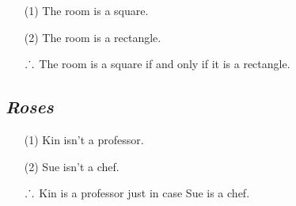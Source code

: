 \documentclass[a4paper, 11pt]{article} %
\def\therefore{\ensuremath{\ldotp\dot{}\,\ldotp}}
\begin{document}
\begin{enumerate}
  \item[(1)] The room is a square.
  \item[(2)] The room is a rectangle.
  \item[\therefore] The room is a square if and only if it is a rectangle.
\end{enumerate}





\subsection*{\it \textbf{Roses}}

\begin{enumerate}
  \item[(1)] Kin isn't a professor.
  \item[(2)] Sue isn't a chef.
  \item[\therefore] Kin is a professor just in case Sue is a chef.
\end{enumerate}



%
\end{document}
